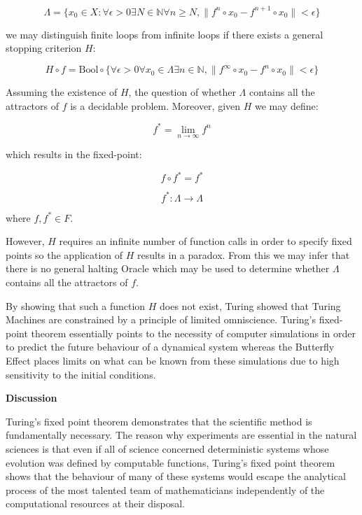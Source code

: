 \documentclass{article}
\begin{document}
\begin{equation}
\Lambda = \{x_0 \in X: \forall \epsilon > 0 \exists N \in \mathbb{N} \forall n \geq N, \lVert f^n \circ x_0 - f^{n+1} \circ x_0 \rVert < \epsilon \}
\end{equation}

we may distinguish finite loops from infinite loops if there exists a general stopping criterion $H$:

\begin{equation}
H \circ f = \textrm{Bool} \circ \{\forall \epsilon > 0 \forall x_0 \in \Lambda \exists n \in \mathbb{N}, \lVert f^{\infty} \circ x_0 - f^n \circ x_0 \rVert < \epsilon \}
\end{equation}

\newpage 

Assuming the existence of $H$, the question of whether $\Lambda$ contains all the attractors of $f$ is a decidable problem. Moreover, given $H$ we may define:

\begin{equation}
f^* = \lim_{n \to \infty} f^n
\end{equation}

which results in the fixed-point:

\begin{equation}
f \circ f^* = f^*
\end{equation}

\begin{equation}
f^*: \Lambda \rightarrow \Lambda
\end{equation}

where $f,f^* \in F$.

However, $H$ requires an infinite number of function calls in order to specify fixed points so the application
of $H$ results in a paradox. From this we may infer that there is no general halting Oracle which may be used
to determine whether $\Lambda$ contains all the attractors of $f$.

By showing that such a function $H$ does not exist, Turing showed that Turing Machines are constrained by a principle of limited omniscience. Turing's fixed-point theorem essentially points to the necessity of computer simulations in order to predict the future behaviour of a dynamical system whereas the Butterfly Effect places limits on what can be known from these simulations due to high sensitivity to the initial conditions.

\textbf{Discussion}

Turing's fixed point theorem demonstrates that the scientific method is fundamentally necessary. The reason why experiments are essential in the natural sciences is that even if all of science concerned deterministic systems whose evolution was defined by computable functions, Turing's fixed point theorem shows that the behaviour of many of these systems would escape the analytical process of the most talented team of mathematicians independently of the computational resources at their disposal.
\end{document}

